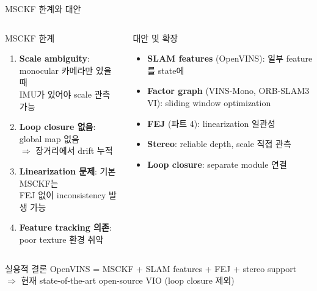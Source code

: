 \begin{frame}{MSCKF 한계와 대안}
  \begin{columns}[T]
      \begin{alertblock}{MSCKF 한계}
        \begin{enumerate}
          \item \textbf{Scale ambiguity}: monocular 카메라만 있을 때\\
            IMU가 있어야 scale 관측 가능
          \item \textbf{Loop closure 없음}: global map 없음\\
            $\Rightarrow$ 장거리에서 drift 누적
          \item \textbf{Linearization 문제}: 기본 MSCKF는\\
            FEJ 없이 inconsistency 발생 가능
          \item \textbf{Feature tracking 의존}: poor texture 환경 취약
        \end{enumerate}
      \end{alertblock}
      \begin{exampleblock}{대안 및 확장}
        \begin{itemize}
          \item \textbf{SLAM features} (OpenVINS): 일부 feature를 state에
          \item \textbf{Factor graph} (VINS-Mono, ORB-SLAM3 VI): sliding window optimization
          \item \textbf{FEJ} (파트 4): linearization 일관성
          \item \textbf{Stereo}: reliable depth, scale 직접 관측
          \item \textbf{Loop closure}: separate module 연결
        \end{itemize}
      \end{exampleblock}
  \end{columns}
  \vspace{0.3em}
  \begin{block}{실용적 결론}
    OpenVINS = MSCKF + SLAM features + FEJ + stereo support\\
    $\Rightarrow$ 현재 state-of-the-art open-source VIO (loop closure 제외)
  \end{block}
\end{frame}


